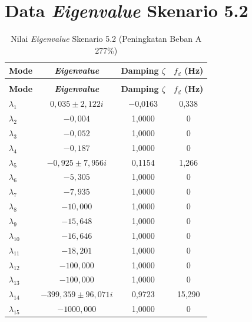 \section{Data \textit{Eigenvalue} Skenario 5.2}
\begingroup
\fontsize{11}{13.2}\selectfont
\setlength{\tabcolsep}{7pt}
\begin{longtable}{>{\centering\arraybackslash}m{1.5cm} c c c} \caption[]{Nilai
	\textit{Eigenvalue} Skenario 5.2 (Peningkatan Beban A 277\%)}
	\label{tab:eigenvalue_sk52_lampiran} \\
	\toprule
	\textbf{Mode} & \textbf{\textit{Eigenvalue}} & \textbf{Damping $\zeta$} &
	\textbf{$f_d$ (Hz)} \\
	\midrule
	\endfirsthead
	\multicolumn{4}{l}{\textit{(lanjutan)}} \\
	\toprule
	\textbf{Mode} & \textbf{\textit{Eigenvalue}} & \textbf{Damping $\zeta$} &
	\textbf{$f_d$ (Hz)} \\
	\midrule
	\endhead
	\bottomrule
	\endfoot
	$\lambda_1$  & $0{,}035 \pm 2{,}122i$            & $-$0,0163 & 0,338 \\
	$\lambda_2$  & $-0{,}004$                         & 1,0000 & 0 \\
	$\lambda_3$  & $-0{,}052$                         & 1,0000 & 0 \\
	$\lambda_4$  & $-0{,}187$                         & 1,0000 & 0 \\
	$\lambda_5$  & $-0{,}925 \pm 7{,}956i$            & 0,1154 & 1,266 \\
	$\lambda_6$  & $-5{,}305$                         & 1,0000 & 0 \\
	$\lambda_7$  & $-7{,}935$                         & 1,0000 & 0 \\
	$\lambda_8$  & $-10{,}000$                        & 1,0000 & 0 \\
	$\lambda_9$  & $-15{,}648$                        & 1,0000 & 0 \\
	$\lambda_{10}$ & $-16{,}646$                      & 1,0000 & 0 \\
	$\lambda_{11}$ & $-18{,}201$                      & 1,0000 & 0 \\
	$\lambda_{12}$ & $-100{,}000$                     & 1,0000 & 0 \\
	$\lambda_{13}$ & $-100{,}000$                     & 1,0000 & 0 \\
	$\lambda_{14}$ & $-399{,}359 \pm 96{,}071i$       & 0,9723 & 15,290 \\
	$\lambda_{15}$ & $-1000{,}000$                    & 1,0000 & 0 \\
\end{longtable}
\par
\endgroup

